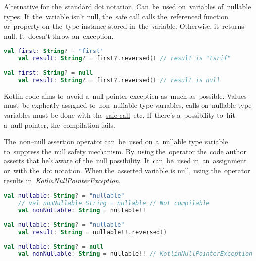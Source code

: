 \label{kotlinsafecall}
Alternative for~the~standard dot notation.
Can~be~used on~variables of~nullable types.
If~the~variable isn't null, the~safe call calls the~referenced function or~property on~the~type instance stored in~the~variable.
Otherwise, it~returns null.
It~doesn't throw an~exception.

\begin{lstlisting}[language=Kotlin]
    val first: String? = "first"
    val result: String? = first?.reversed() // result is "tsrif"
\end{lstlisting}

\begin{lstlisting}[language=Kotlin]
    val first: String? = null
    val result: String? = first?.reversed() // result is null
\end{lstlisting}

Kotlin code aims to~avoid a~null pointer exception as~much as~possible.
Values must~be explicitly assigned to~non--nullable type variables, calls on~nullable type variables must~be done with the~\hyperref[kotlinsafecall]{safe call}~etc.
If~there's a~possibility to~hit a~null pointer, the~compilation fails.

\mbox{The~non--null} assertion operator can~be~used on~a~nullable type variable to~suppress the~null safety mechanism.
By~using the~operator the~code author asserts that he's aware of the~null possibility.
It~can~be~used in~an~assignment or~with the~dot notation.
When the~asserted variable is null, using the~operator results \mbox{in \textit{KotlinNullPointerException}.}
\newpage

\begin{lstlisting}[language=Kotlin]
    val nullable: String? = "nullable"
    // val nonNullable String = nullable // Not compilable
    val nonNullable: String = nullable!!
\end{lstlisting}

\begin{lstlisting}[language=Kotlin]
    val nullable: String? = "nullable"
    val result: String = nullable!!.reversed()
\end{lstlisting}

\begin{lstlisting}[language=Kotlin]
    val nullable: String? = null
    val nonNullable: String = nullable!! // KotlinNullPointerException
\end{lstlisting}

